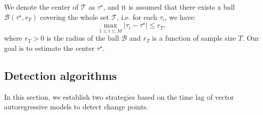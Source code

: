 \documentclass[11pt]{article}
\begin{document}

We denote the center of $\mathcal{T}$ as $\tau^\star$, and it is assumed that there exists a ball $\mathcal{B}(\tau^\star, r_T)$ covering the whole set $\mathcal{T}$, i.e. for each $\tau_i$, we have:
\begin{equation}
    \label{eq:2}
    \max_{1\leq i \leq M}|\tau_i - \tau^\star| \leq r_T,
\end{equation}
where $r_T > 0$ is the radius of the ball $\mathcal{B}$ and $r_T$ is a function of sample size $T$. Our goal is to estimate the center $\tau^\star$. 


\subsection{Detection algorithms}\label{sec:algorithms}
In this section, we establish two strategies based on the time lag of vector autoregressive models to detect change points. 
\end{document}
